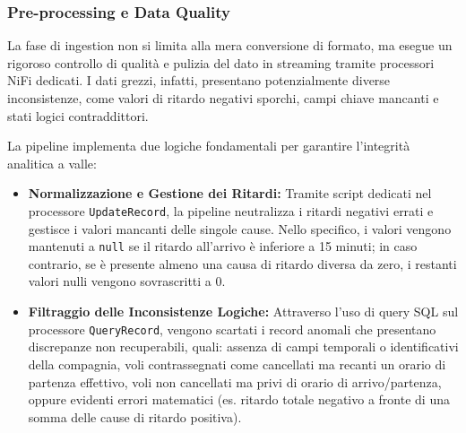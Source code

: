 \documentclass[conference]{IEEEtran}
\begin{document}
\subsubsection{Pre-processing e Data Quality}
La fase di ingestion non si limita alla mera conversione di formato, ma esegue un rigoroso controllo di qualità e pulizia del dato in streaming tramite processori NiFi dedicati.
I dati grezzi, infatti, presentano potenzialmente diverse inconsistenze, come valori di ritardo negativi sporchi, campi chiave mancanti e stati logici contraddittori.

La pipeline implementa due logiche fondamentali per garantire l'integrità analitica a valle:
\begin{itemize}
    \item \textbf{Normalizzazione e Gestione dei Ritardi:} Tramite script dedicati nel processore \texttt{UpdateRecord}, la pipeline neutralizza i ritardi negativi errati e gestisce i valori mancanti delle singole cause.
    Nello specifico, i valori vengono mantenuti a \texttt{null} se il ritardo all'arrivo è inferiore a 15 minuti; in caso contrario, se è presente almeno una causa di ritardo diversa da zero, i restanti valori nulli vengono sovrascritti a 0.
    \item \textbf{Filtraggio delle Inconsistenze Logiche:} Attraverso l'uso di query SQL sul processore \texttt{QueryRecord}, vengono scartati i record anomali che presentano discrepanze non recuperabili, quali: assenza di campi temporali o identificativi della compagnia, voli contrassegnati come cancellati ma recanti un orario di partenza effettivo, voli non cancellati ma privi di orario di arrivo/partenza, oppure evidenti errori matematici (es. ritardo totale negativo a fronte di una somma delle cause di ritardo positiva).
\end{itemize}
\end{document}
